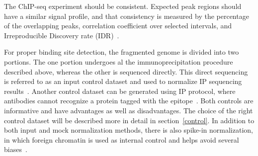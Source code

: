 The ChIP-seq experiment should be consistent. 
Expected peak regions should have a similar signal profile, and that consistency is measured by the percentage of the overlapping peaks, correlation coefficient over selected intervals, and Irreproducible Discovery rate (IDR)~\cite{shin2013computational}.

For proper binding site detection, the fragmented genome is divided into two portions. 
The one portion undergoes al the immunoprecipitation procedure described above, whereas the other is sequenced directly. 
This direct sequencing is referred to as an input control dataset and used to normalize IP sequencing results~\cite{kidder2011chip}. 
Another control dataset can be generated using IP protocol, where antibodies cannot recognize a protein tagged with the epitope~\cite{flensburg2014comparison}. 
Both controls are informative and have advantages as well as disadvantages.
The choice of the right control dataset will be described more in detail in section~\ref{control}.
In addition to both input and mock normalization methods, there is also spike-in normalization, in which foreign chromatin is used as internal control and helps avoid several biases~\cite{bonhoure2014quantifying}.